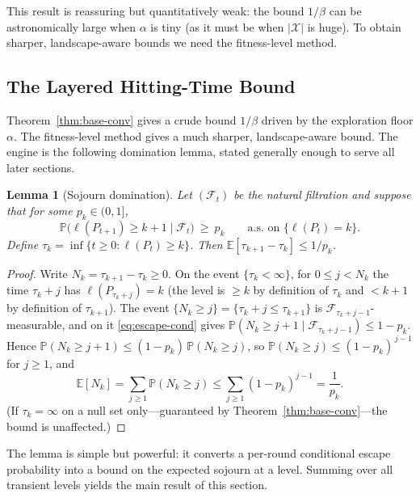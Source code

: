 \documentclass[11pt,a4paper]{article}
\newtheorem{lemma}[theorem]{Lemma}
\newcommand{\X}{\mathcal{X}}
\newcommand{\calF}{\mathcal{F}}
\newcommand{\E}{\mathbb{E}}
\newcommand{\Prob}{\mathbb{P}}
\begin{document}
This result is reassuring but quantitatively weak: the bound $1/\beta$ can
be astronomically large when $\alpha$ is tiny (as it must be when $|\X|$
is huge).  To obtain sharper, landscape-aware bounds we need the
fitness-level method.

\subsection{The Layered Hitting-Time Bound}
\label{sec:layered}

Theorem~\ref{thm:base-conv} gives a crude bound $1/\beta$ driven by the
exploration floor $\alpha$.  The fitness-level method gives a much
sharper, landscape-aware bound.  The engine is the following domination
lemma, stated generally enough to serve all later sections.

\begin{lemma}[Sojourn domination]\label{lem:sojourn}
  Let $(\calF_t)$ be the natural filtration and suppose that for some
  $p_k\in(0,1]$,
  \begin{equation}
    \Prob\bigl(\ell(P_{t+1})\ge k+1\mid\calF_t\bigr)\ \ge\ p_k
    \qquad\text{a.s.\ on }\{\ell(P_t)=k\}.
    \label{eq:escape-cond}
  \end{equation}
  Define $\tau_k=\inf\{t\ge0:\ell(P_t)\ge k\}$.  Then
  $\E[\tau_{k+1}-\tau_k]\le 1/p_k$.
\end{lemma}

\begin{proof}
  Write $N_k=\tau_{k+1}-\tau_k\ge0$.  On the event
  $\{\tau_k<\infty\}$, for $0\le j<N_k$ the time $\tau_k+j$ has
  $\ell(P_{\tau_k+j})=k$ (the level is $\ge k$ by definition of
  $\tau_k$ and $<k+1$ by definition of $\tau_{k+1}$).  The event
  $\{N_k\ge j\}=\{\tau_k+j\le\tau_{k+1}\}$ is
  $\calF_{\tau_k+j-1}$-measurable, and on it
  \eqref{eq:escape-cond} gives
  $\Prob(N_k\ge j+1\mid\calF_{\tau_k+j-1})\le1-p_k$.  Hence
  $\Prob(N_k\ge j+1)\le(1-p_k)\,\Prob(N_k\ge j)$, so
  $\Prob(N_k\ge j)\le(1-p_k)^{\,j-1}$ for $j\ge1$, and
  \[
    \E[N_k]=\sum_{j\ge1}\Prob(N_k\ge j)
    \le\sum_{j\ge1}(1-p_k)^{j-1}=\frac1{p_k}.
  \]
  (If $\tau_k=\infty$ on a null set only---guaranteed by
  Theorem~\ref{thm:base-conv}---the bound is unaffected.)
\end{proof}

The lemma is simple but powerful: it converts a per-round conditional
escape probability into a bound on the expected sojourn at a level.
Summing over all transient levels yields the main result of this section.
\end{document}
